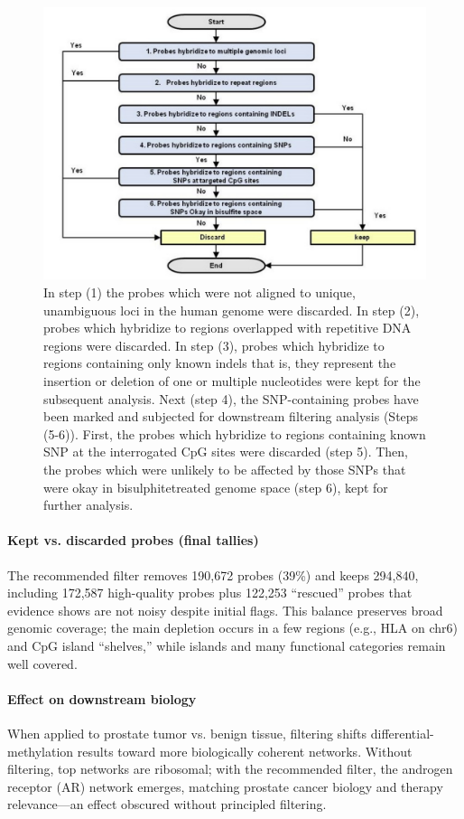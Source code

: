 \documentclass[10pt]{extarticle}
\begin{document}
\begin{figure}[h]
  \centering
  \includegraphics[width=0.7\linewidth]{Figures/Workflow for determining affected Probes..jpg}
  \caption{In step (1) the probes which were
not aligned to unique, unambiguous loci in the human genome were discarded. In step (2),
probes which hybridize to regions overlapped with repetitive DNA regions were discarded.
In step (3), probes which hybridize to regions containing only known indels that is, they
represent the insertion or deletion of one or multiple nucleotides were kept for the
subsequent analysis. Next (step 4), the SNP-containing probes have been marked and
subjected for downstream filtering analysis (Steps (5-6)). First, the probes which hybridize to
regions containing known SNP at the interrogated CpG sites were discarded (step 5). Then,
the probes which were unlikely to be affected by those SNPs that were okay in bisulphitetreated genome space (step 6), kept for further analysis.}
  \label{fig:Workflow}
\end{figure}



\paragraph{Kept vs. discarded probes (final tallies)}
The recommended filter removes 190{,}672 probes (39\%) and keeps 294{,}840, including 172{,}587 high-quality probes plus 122{,}253 “rescued” probes that evidence shows are not noisy despite initial flags. This balance preserves broad genomic coverage; the main depletion occurs in a few regions (e.g., HLA on chr6) and CpG island “shelves,” while islands and many functional categories remain well covered. 

\paragraph{Effect on downstream biology}
When applied to prostate tumor vs. benign tissue, filtering shifts differential-methylation results toward more biologically coherent networks. Without filtering, top networks are ribosomal; with the recommended filter, the androgen receptor (AR) network emerges, matching prostate cancer biology and therapy relevance—an effect obscured without principled filtering. 
\end{document}
